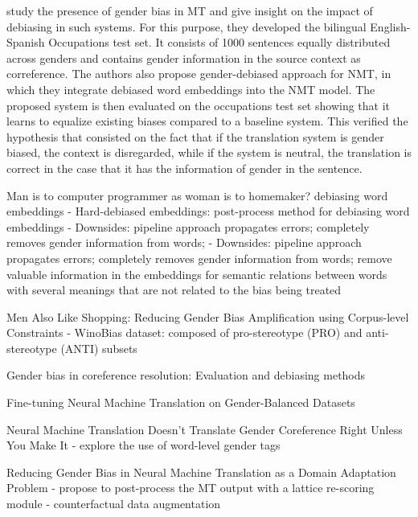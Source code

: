 \citet{Escud_Font_2019} study the presence of gender bias in MT and give insight on
the impact of debiasing in such systems. For this purpose, they developed the bilingual English-Spanish Occupations test set. It consists of 1000 sentences equally distributed across genders and contains gender information in the source context as correference. The authors also propose gender-debiased approach for NMT, in which they integrate debiased word embeddings into the NMT model. The proposed system is then evaluated on the occupations test set showing that it learns to equalize existing biases compared to a baseline system. This verified the hypothesis that consisted on the fact that if the translation system is gender biased, the context is disregarded, while if the system is neutral, the translation is correct in the case that it has the information of gender in the sentence.


Man is to computer programmer as woman is to
homemaker? debiasing word embeddings \parencite{bolukbasi2016man}
- Hard-debiased embeddings: post-process method for debiasing word embeddings
- Downsides: pipeline approach propagates errors; completely removes gender information from words; 
- Downsides: pipeline approach propagates errors; completely removes gender information from words;  remove valuable information in the embeddings for semantic relations between words with several meanings that are not related to the bias being treated

Men Also Like Shopping: Reducing Gender Bias Amplification using Corpus-level Constraints \parencite{Zhao_2017}
- WinoBias dataset: composed of pro-stereotype (PRO) and anti-stereotype (ANTI) subsets

Gender bias in coreference resolution: Evaluation and debiasing
methods \parencite{Zhao_2018_coreference}

Fine-tuning Neural Machine Translation on Gender-Balanced Datasets \parencite{costa2020fine}

Neural Machine Translation Doesn't Translate Gender Coreference Right Unless You Make It \parencite{Saunders_2020_coreference}
- explore the use of word-level gender tags

Reducing Gender Bias in Neural Machine Translation as a Domain Adaptation Problem \parencite{Saunders_2020}
- propose to post-process the MT output with a lattice re-scoring module
- counterfactual data augmentation
 
